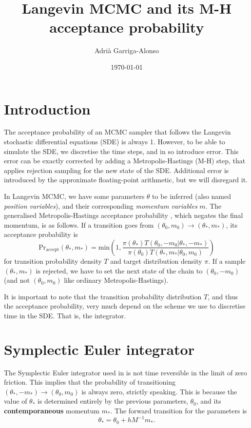 \documentclass{article}
\author{Adrià Garriga-Alonso}
\date{\today}
\title{Langevin MCMC and its M-H acceptance probability}
\begin{document}
\maketitle
{}

\section{Introduction}
\label{sec:orgb532d68}
The acceptance probability of an MCMC sampler that follows the Langevin
stochastic differential equations (SDE) is always 1. However, to be able to
simulate the SDE, we discretise the time steps, and in so introduce error.
This error can be exactly corrected \cite{sarkka_solin_2019} by adding a
Metropolis-Hastings (M-H) step, that applies rejection sampling for the new
state of the SDE. Additional error is introduced by the approximate
floating-point arithmetic, but we will disregard it.

In Langevin MCMC, we have some parameters \(\theta\) to be inferred (also named
\emph{position variables}), and their corresponding \emph{momentum variables} \(m\). The
generalised Metropolis-Hastings acceptance probability \cite{bussi-parrinello},
which negates the final momentum, is as follows. If a transition goes from 
\((\theta_0, m_0) \to (\theta_*, m_*)\), its acceptance probability is
\begin{equation}
  \text{Pr}_\text{accept}(\theta_*, m_*) = \text{min}\left(1,
      \frac{\pi(\theta_*) T(\theta_0, -m_0 | \theta_*, -m_*)}
          {\pi(\theta_0) T(\theta_*, m_* | \theta_0, m_0)} \right)
\end{equation}
for transition probability density \(T\) and target distribution density \(\pi\).
If a sample \((\theta_*, m_*)\) is rejected, we have to set the next state of
the chain to \((\theta_0, -m_0)\) (and not \((\theta_0, m_0)\) like ordinary
Metropolis-Hastings).

It is important to note that the transition probability distribution \(T\), and
thus the acceptance probability, very much depend on the scheme we use to
discretise time in the SDE. That is, the integrator.

\section{Symplectic Euler integrator}
\label{sec:org786af88}
The Symplectic Euler integrator used in \cite{wenzel20posterior} is not time
reversible in the limit of zero friction. This implies that the probability of
transitioning \((\theta_*, -m_*) \to (\theta_0, m_0)\) is always zero, strictly
speaking. This is because the value of \(\theta_*\) is determined entirely by
the previous parameters, \(\theta_0\), and its \textbf{contemporaneous} momentum
\(m_*\). The forward transition for the parameters is
\begin{equation}
  \theta_* = \theta_0 + h M^{-1} m_*.
\end{equation}
\end{document}
